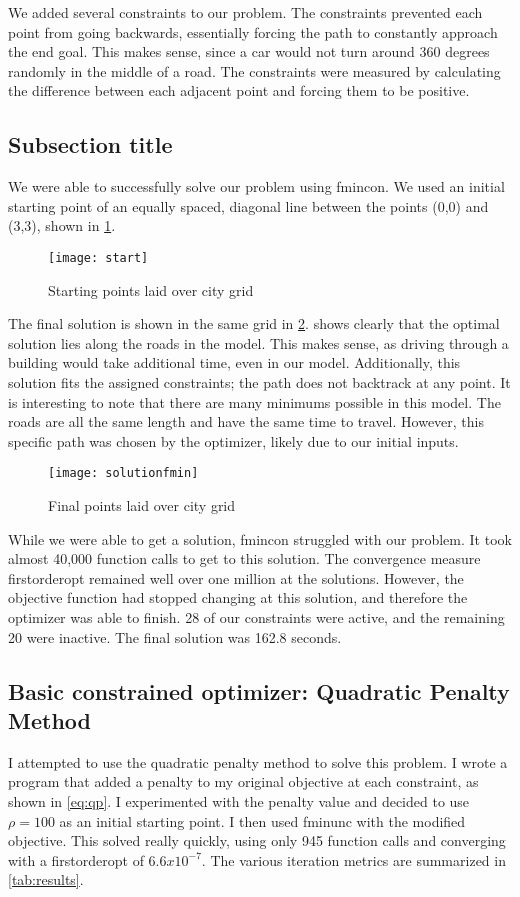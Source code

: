 \documentclass{article}
\begin{document}
We added several constraints to our problem. The constraints prevented each point from going backwards, essentially forcing the path to constantly approach the end goal. This makes sense, since a car would not turn around 360 degrees randomly in the middle of a road. The constraints were measured by calculating the difference between each adjacent point and forcing them to be positive.

\subsection{Subsection title}
We were able to successfully solve our problem using fmincon. We used an initial starting point of an equally spaced, diagonal line between the points (0,0) and (3,3), shown in \cref{fig:start}.

\begin{figure}[htpb]
\centering
\texttt{[image: start]}
\caption{Starting points laid over city grid}
\label{fig:start}
\end{figure}

The final solution is shown in the same grid in \cref{fig:solutionfmin}.  shows clearly that the optimal solution lies along the roads in the model. This makes sense, as driving through a building would take additional time, even in our model. Additionally, this solution fits the assigned constraints; the path does not backtrack at any point. It is interesting to note that there are many minimums possible in this model. The roads are all the same length and have the same time to travel. However, this specific path was chosen by the optimizer, likely due to our initial inputs.
 
\begin{figure}[htpb]
\centering
\texttt{[image: solutionfmin]}
\caption{Final points laid over city grid}
\label{fig:solutionfmin}
\end{figure}

While we were able to get a solution, fmincon struggled with our problem. It took almost 40,000 function calls to get to this solution. The convergence measure firstorderopt remained well over one million at the solutions. However, the objective function had stopped changing at this solution, and therefore the optimizer was able to finish. 28 of our constraints were active, and the remaining 20 were inactive. The final solution was 162.8 seconds.

\subsection{Basic constrained optimizer: Quadratic Penalty Method}
I attempted to use the quadratic penalty method to solve this problem. I wrote a program that added a penalty to my original objective at each constraint, as shown in \cref{eq:qp}. I experimented with the penalty value and decided to use $\rho = 100$ as an initial starting point. I then used fminunc with the modified objective. This solved really quickly, using only 945 function calls and converging with a firstorderopt of $6.6 x 10^{-7}$. The various iteration metrics are summarized in \cref{tab:results}. 
\end{document}
